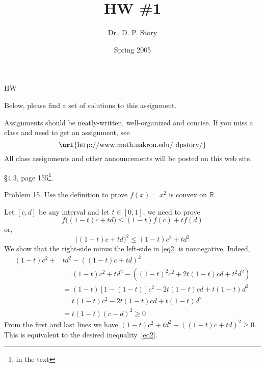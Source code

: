 \documentclass[12pt]{article}
\title[HW1]{HW \#1}
\author{Dr.\ D. P. Story}
\date{Spring 2005}
\begin{document}
\maketitle

\begin{exam}{HW}

\ifanswerkey
\begin{instructions}[Solutions]
Below, please find a set of solutions to this assignment.
\end{instructions}
\else
\begin{instructions}[]
Assignments should be neatly-written, well-organized and concise.
If you miss a class and need to get an assignment, see
$$
   \text{\url{http://www.math.uakron.edu/~dpstory/}}
$$
All class assignments and other announcements will be posted on
this web site.
\end{instructions}
\fi

\begin{eqComments}[]\S4.3, page 155\footnote{in the text}.\end{eqComments}

\begin{problem}[4]
Problem 15. Use the definition to prove $f(x) = x^2$ is convex on
$\mathbb{R}$.
\begin{solution}
Let $[c,d]$ be any interval and let $t\in[0,1]$, we need to prove
\begin{equation}
    f\bigl(  (1-t)c + td \bigr) \le (1-t) f(c) + tf(d)\label{eq0}
\end{equation}
or,
\begin{equation}
    \bigl( ( 1-t )c + td \bigr)^2 \le (1-t) c^2 + t d^2\label{eq2}
\end{equation}
We show that the right-side minus the left-side in \eqref{eq2} is  nonnegative. Indeed,
\begin{align*}
    (1-t) c^2 + &t d^2 - \left( ( 1-t )c + td \right)^2 \\&
        = (1-t) c^2 + t d^2 - \left( ( 1-t )^2 c^2 + 2t(1-t)cd + t^2d^2 \right)\\&
        = (1-t)[1-(1-t)]c^2 - 2t(1-t)cd + t(1-t)d^2\\&
        = t(1-t)c^2 - 2t(1-t)cd + t(1-t)d^2\\&
        = t(1-t)( c - d )^2 \ge 0
\end{align*}
From the first and last lines we have  $(1-t) c^2 + t d^2 - \left( ( 1-t )c + td \right)^2\ge0$. This is equivalent
to the desired inequality~\eqref{eq2}. \eqfititin{$\square$}


\end{solution}
\end{problem}
\end{exam}
\end{document}
